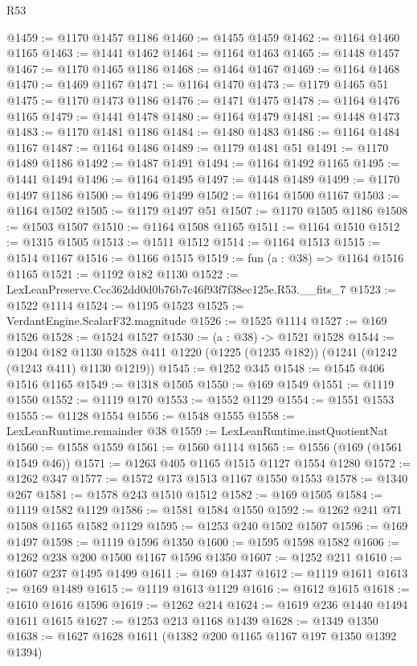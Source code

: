 \begin{lexlean}{R53}
\begin{coremodule}
@1459 := @1170 @1457 @1186
@1460 := @1455 @1459
@1462 := @1164 @1460 @1165
@1463 := @1441 @1462
@1464 := @1164 @1463
@1465 := @1448 @1457
@1467 := @1170 @1465 @1186
@1468 := @1464 @1467
@1469 := @1164 @1468
@1470 := @1469 @1167
@1471 := @1164 @1470
@1473 := @1179 @1465 @51
@1475 := @1170 @1473 @1186
@1476 := @1471 @1475
@1478 := @1164 @1476 @1165
@1479 := @1441 @1478
@1480 := @1164 @1479
@1481 := @1448 @1473
@1483 := @1170 @1481 @1186
@1484 := @1480 @1483
@1486 := @1164 @1484 @1167
@1487 := @1164 @1486
@1489 := @1179 @1481 @51
@1491 := @1170 @1489 @1186
@1492 := @1487 @1491
@1494 := @1164 @1492 @1165
@1495 := @1441 @1494
@1496 := @1164 @1495
@1497 := @1448 @1489
@1499 := @1170 @1497 @1186
@1500 := @1496 @1499
@1502 := @1164 @1500 @1167
@1503 := @1164 @1502
@1505 := @1179 @1497 @51
@1507 := @1170 @1505 @1186
@1508 := @1503 @1507
@1510 := @1164 @1508 @1165
@1511 := @1164 @1510
@1512 := @1315 @1505
@1513 := @1511 @1512
@1514 := @1164 @1513
@1515 := @1514 @1167
@1516 := @1166 @1515
@1519 := fun (a : @38) => @1164 @1516 @1165
@1521 := @1192 @182 @1130
@1522 := LexLeanPreserve.Ccc362dd0d0b76b7c46f93f7f38ec125e.R53.__fits_7
@1523 := @1522 @1114
@1524 := @1195 @1523
@1525 := VerdantEngine.ScalarF32.magnitude
@1526 := @1525 @1114
@1527 := @169 @1526
@1528 := @1524 @1527
@1530 := (a : @38) -> @1521 @1528
@1544 := @1204
    @182
    @1130
    @1528
    @411
    @1220
    (@1225 (@1235 @182))
    (@1241 (@1242 (@1243 @411) @1130 @1219))
@1545 := @1252 @345
@1548 := @1545 @406 @1516 @1165
@1549 := @1318 @1505
@1550 := @169 @1549
@1551 := @1119 @1550
@1552 := @1119 @170
@1553 := @1552 @1129
@1554 := @1551 @1553
@1555 := @1128 @1554
@1556 := @1548 @1555
@1558 := LexLeanRuntime.remainder @38
@1559 := LexLeanRuntime.instQuotientNat
@1560 := @1558 @1559
@1561 := @1560 @1114
@1565 := @1556 (@169 (@1561 @1549 @46))
@1571 := @1263 @405 @1165 @1515 @1127 @1554 @1280
@1572 := @1262 @347
@1577 := @1572 @173 @1513 @1167 @1550 @1553
@1578 := @1340 @267
@1581 := @1578 @243 @1510 @1512
@1582 := @169 @1505
@1584 := @1119 @1582 @1129
@1586 := @1581 @1584 @1550
@1592 := @1262 @241 @71 @1508 @1165 @1582 @1129
@1595 := @1253 @240 @1502 @1507
@1596 := @169 @1497
@1598 := @1119 @1596 @1350
@1600 := @1595 @1598 @1582
@1606 := @1262 @238 @200 @1500 @1167 @1596 @1350
@1607 := @1252 @211
@1610 := @1607 @237 @1495 @1499
@1611 := @169 @1437
@1612 := @1119 @1611
@1613 := @169 @1489
@1615 := @1119 @1613 @1129
@1616 := @1612 @1615
@1618 := @1610 @1616 @1596
@1619 := @1262 @214
@1624 := @1619 @236 @1440 @1494 @1611 @1615
@1627 := @1253 @213 @1168 @1439
@1628 := @1349 @1350
@1638 := @1627 @1628 @1611 (@1382 @200 @1165 @1167 @197 @1350 @1392 @1394)

\end{coremodule}
\end{lexlean}
